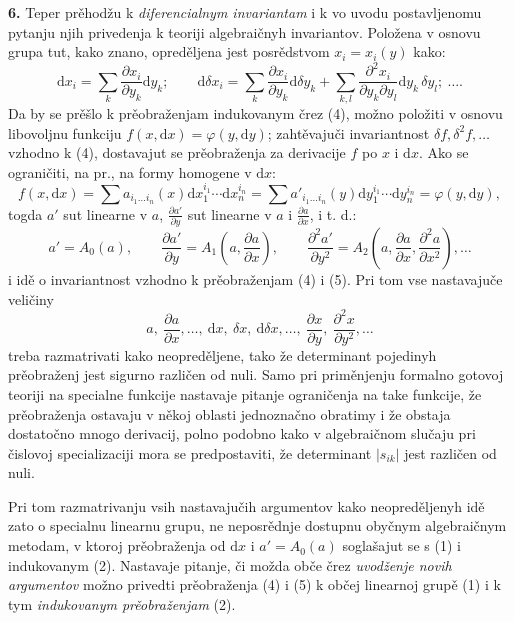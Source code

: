 \documentclass[11pt]{article}
\providecommand{\dd}{\mathrm d}
\begin{document}
\textbf{6.} Teper prěhodžu k \emph{diferencialnym invariantam} i k vo uvodu postavljenomu pytanju njih privedenja k teoriji algebraičnyh invariantov. Položena v osnovu grupa tut, kako znano, opreděljena jest posrědstvom $x_i=x_i(y)$ kako:
\[
\tag{4}
\dd x_i=\sum_k \frac{\partial x_i}{\partial y_k}\dd y_k;\qquad
\dd\delta x_i=\sum_k \frac{\partial x_i}{\partial y_k}\dd\delta y_k+
\sum_{k,l}\frac{\partial^2 x_i}{\partial y_k\partial y_l}\dd y_k\,\delta y_l;\ \ldots .
\]
Da by se prěšlo k prěobraženjam indukovanym črez (4), možno položiti v osnovu libovoljnu funkciju $f(x,\dd x)=\varphi(y,\dd y)$; zahtěvajuči invariantnost $\delta f,\delta^2f,\ldots$ vzhodno k (4), dostavajut se prěobraženja za derivacije $f$ po $x$ i $\dd x$. Ako se ograničiti, na pr., na formy homogene v $\dd x$:
\[
 f(x,\dd x)=\sum a_{i_1\ldots i_n}(x)\dd x_1^{i_1}\cdots\dd x_n^{i_n}
 =\sum a'_{i_1\ldots i_n}(y)\dd y_1^{i_1}\cdots\dd y_n^{i_n}
 =\varphi(y,\dd y),
\]
togda $a'$ sut linearne v $a$, $\frac{\partial a'}{\partial y}$ sut linearne v $a$ i $\frac{\partial a}{\partial x}$, i t. d.:
\[
\tag{5}
a'=A_0(a),\qquad
\frac{\partial a'}{\partial y}=A_1\!\left(a,\frac{\partial a}{\partial x}\right),\qquad
\frac{\partial^2 a'}{\partial y^2}=A_2\!\left(a,\frac{\partial a}{\partial x},\frac{\partial^2 a}{\partial x^2}\right),\ldots
\]
i idě o invariantnost vzhodno k prěobraženjam (4) i (5). Pri tom vse nastavajuče veličiny
\[
a,\ \frac{\partial a}{\partial x},\ldots,\ \dd x,\ \delta x,\ \dd\delta x,\ldots,\ 
\frac{\partial x}{\partial y},\ \frac{\partial^2 x}{\partial y^2},\ldots
\]
treba razmatrivati kako neopreděljene, tako že determinant pojedinyh prěobraženj jest sigurno različen od nuli. Samo pri priměnjenju formalno gotovoj teoriji na specialne funkcije nastavaje pitanje ograničenja na take funkcije, že prěobraženja ostavaju v někoj oblasti jednoznačno obratimy i že obstaja dostatočno mnogo derivacij, polno podobno kako v algebraičnom slučaju pri čislovoj specializaciji mora se predpostaviti, že determinant $|s_{ik}|$ jest različen od nuli.

Pri tom razmatrivanju vsih nastavajučih argumentov kako neopreděljenyh idě zato o specialnu linearnu grupu, ne neposrědnje dostupnu obyčnym algebraičnym metodam, v ktoroj prěobraženja od $\dd x$ i $a'=A_0(a)$ soglašajut se s (1) i indukovanym (2). Nastavaje pitanje, či možda obče črez \emph{uvodženje novih argumentov} možno privedti prěobraženja (4) i (5) k občej linearnoj grupě (1) i k tym \emph{indukovanym prěobraženjam} (2).
\end{document}
